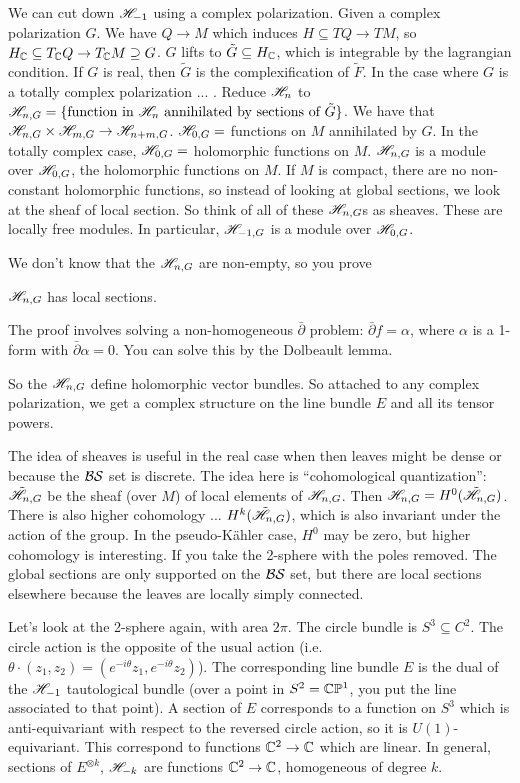  We can cut down $\mathscr{H}_{-1}$ using a complex polarization. Given a complex polarization
 $G$.  We have $Q\to M$ which induces $H\subseteq TQ\to TM$, so $H_{\mathbb{C}}\subseteq T_{\mathbb{C}}
 Q\to T_{\mathbb{C}} M\supseteq G$. $G$ lifts to $\tilde G\subseteq H_{\mathbb{C}}$, which is integrable
 by the lagrangian condition.  If $G$ is real, then $\tilde G$ is the complexification
 of $\tilde F$.  In the case where $G$ is a totally complex polarization ... .  Reduce
 $\mathscr{H}_{n}$ to $\mathscr{H}_{n, G} = \{ \text{function in $\mathscr{H}_n$ annihilated by sections of }
 \tilde G\}$. We have that $\mathscr{H}_{n,G}\times \mathscr{H}_{m,G}\to \mathscr{H}_{n+m,G}$.  $\mathscr{H}_{0,G} =$
 functions on $M$ annihilated by $G$.  In the totally complex case, $\mathscr{H}_{0,G}=$
 holomorphic functions on $M$.  $\mathscr{H}_{n,G}$ is a module over $\mathscr{H}_{0,G}$, the
 holomorphic functions on $M$. If $M$ is compact, there are no non-constant
 holomorphic functions, so instead of looking at global sections, we look at the sheaf
 of local section.  So think of all of these $\mathscr{H}_{n,G}$s as sheaves. These are locally free
 modules.
 In particular, $\mathscr{H}_{-1,G}$ is a module over $\mathscr{H}_{0,G}$.

 We don't know that the $\mathscr{H}_{n,G}$ are non-empty, so you prove
 \begin{lemma}
   $\mathscr{H}_{n,G}$ has local sections.
 \end{lemma}
 The proof involves solving a non-homogeneous $\bar \partial$ problem: $\bar\partial
 f=\alpha$, where $\alpha$ is a 1-form with $\bar\partial \alpha=0$.  You can solve
 this by the Dolbeault lemma.

 So the $\mathscr{H}_{n,G}$ define holomorphic vector bundles.  So attached to any complex
 polarization, we get a complex structure on the line bundle $E$ and all its tensor
 powers.

 The idea of sheaves is useful in the real case when then leaves might be dense or
 because the $\mathcal{BS}$ set is discrete.  The idea here is ``cohomological quantization'':
 $\tilde {\mathscr{H}}_{n,G}$ be the sheaf (over $M$) of local elements of $\mathscr{H}_{n,G}$.  Then
 $\mathscr{H}_{n,G}= H^0(\tilde {\mathscr{H}}_{n,G})$.  There is also higher cohomology ...
 $H^k(\tilde{\mathscr{H}}_{n,G})$, which is also invariant under the action of the group.  In the
 pseudo-K\"ahler case, $H^0$ may be zero, but higher cohomology is interesting.  If
 you take the 2-sphere with the poles removed.  The global sections are only supported
 on the $\mathcal{BS}$ set, but there are local sections elsewhere because the leaves are
 locally simply connected.

 Let's look at the 2-sphere again, with area $2\pi$.  The circle bundle is
 $S^3\subseteq C^2$.  The circle action is the opposite of the usual action
 (i.e.~$\theta\cdot (z_1,z_2)=(e^{-i\theta}z_1,e^{-i\theta}z_2)$).  The corresponding
 line bundle $E$ is the dual of the $\mathscr{H}_{-1}$ tautological bundle (over a point in
 $S^2=\mathbb{C}\mathbb{P}^1$, you put the line associated to that point).  A section of $E$
 corresponds to a function on $S^3$ which is anti-equivariant with respect to the
 reversed circle action, so it is $U(1)$-equivariant.  This correspond to functions
 $\mathbb{C}^2\to \mathbb{C}$ which are linear.  In general, sections of $E^{\otimes k}$, $\mathscr{H}_{-k}$ are
 functions $\mathbb{C}^2\to \mathbb{C}$, homogeneous of degree $k$.

